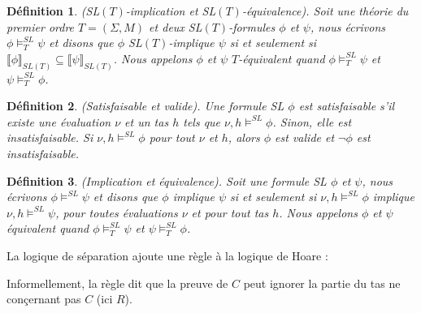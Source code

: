 \documentclass[11pt,openany]{article}
\newcommand\phibra{\llbracket\phi\rrbracket}
\newcommand\psibra{\llbracket\psi\rrbracket}
\newtheorem{definition}{D\'efinition}[subsection]
\begin{document}
\begin{definition}
(SL$(T)$-implication et SL$(T)$-\'equivalence). Soit une th\'eorie du premier ordre $T=(\Sigma,M)$ et deux SL$(T)$-formules $\phi$ et $\psi$, nous \'ecrivons $\phi\models^{SL}_{T}\psi$ et disons que $\phi$ SL$(T)$-implique $\psi$ si et seulement si $\phibra_{SL(T)}\subseteq\psibra_{SL(T)}$. Nous appelons $\phi$ et $\psi$ $T$-\'equivalent quand  $\phi\models^{SL}_{T}\psi$ et $\psi\models^{SL}_{T}\phi$. 
\end{definition}

\begin{definition}
(Satisfaisable et valide). Une formule SL $\phi$ est satisfaisable s'il existe une \'evaluation $\nu$ et un tas $h$ tels que $\nu,h\models^{SL}\phi$. Sinon, elle est \textit{insatisfaisable}. Si $\nu,h\models^{SL}\phi$ pour tout $\nu$ et $h$, alors $\phi$ est valide et $\neg\phi$ est insatisfaisable.
\end{definition}

\begin{definition}
(Implication et \'equivalence). Soit une formule SL $\phi$ et $\psi$, nous \'ecrivons $\phi\models^{SL}\psi$ et disons que $\phi$ implique $\psi$ si et seulement si $\nu,h\models^{SL}\phi$ implique $\nu,h\models^{SL}\psi$, pour toutes \'evaluations $\nu$ et pour tout tas $h$. Nous appelons $\phi$ et $\psi$ \'equivalent quand $\phi\models^{SL}_{T}\psi$ et $\psi\models^{SL}_{T}\phi$. 
\end{definition}

La logique de s\'eparation ajoute une r\`egle \`a la logique de Hoare :
		\begin{center}
		


		\end{center}
		Informellement, la r\`egle dit que la preuve de $C$ peut ignorer la partie du tas ne con\c{c}ernant pas $C$ (ici $R$).
		
\end{document}
